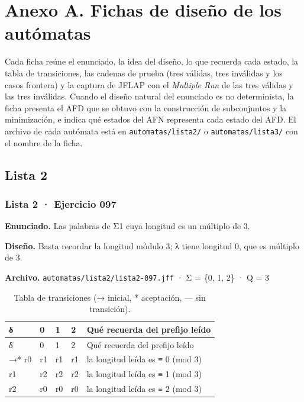\hypertarget{anexo-a.-fichas-de-diseuxf1o-de-los-autuxf3matas}{%
\section{Anexo A. Fichas de diseño de los autómatas}\label{anexo-a.-fichas-de-diseuxf1o-de-los-autuxf3matas}}

Cada ficha reúne el enunciado, la idea del diseño, lo que recuerda cada estado, la tabla de transiciones, las cadenas de prueba (tres válidas, tres inválidas y los casos frontera) y la captura de JFLAP con el \emph{Multiple Run} de las tres válidas y las tres inválidas. Cuando el diseño natural del enunciado es no determinista, la ficha presenta el AFD que se obtuvo con la construcción de subconjuntos y la minimización, e indica qué estados del AFN representa cada estado del AFD. El archivo de cada autómata está en \texttt{automatas/lista2/} o \texttt{automatas/lista3/} con el nombre de la ficha.

\hypertarget{lista-2}{%
\subsection{Lista 2}\label{lista-2}}

\hypertarget{lista-2-ejercicio-097}{%
\subsubsection{Lista 2 · Ejercicio 097}\label{lista-2-ejercicio-097}}

\textbf{Enunciado.} Las palabras de Σ1 cuya longitud es un múltiplo de 3.

\textbf{Diseño.} Basta recordar la longitud módulo 3; λ tiene longitud 0, que es múltiplo de 3.

\textbf{Archivo.} \texttt{automatas/lista2/lista2-097.jff} · Σ = \{0, 1, 2\} · \textbar Q\textbar{} = 3

\begin{longtable}[]{@{}lllll@{}}
\caption{Tabla de transiciones (→ inicial, * aceptación, --- sin transición).}\tabularnewline
\toprule\noalign{}
δ & 0 & 1 & 2 & Qué recuerda del prefijo leído \\
\midrule\noalign{}
\endfirsthead
\toprule\noalign{}
δ & 0 & 1 & 2 & Qué recuerda del prefijo leído \\
\midrule\noalign{}
\endhead
\bottomrule\noalign{}
\endlastfoot
→* r0 & r1 & r1 & r1 & la longitud leída es ≡ 0 (mod 3) \\
r1 & r2 & r2 & r2 & la longitud leída es ≡ 1 (mod 3) \\
r2 & r0 & r0 & r0 & la longitud leída es ≡ 2 (mod 3) \\
\end{longtable}

